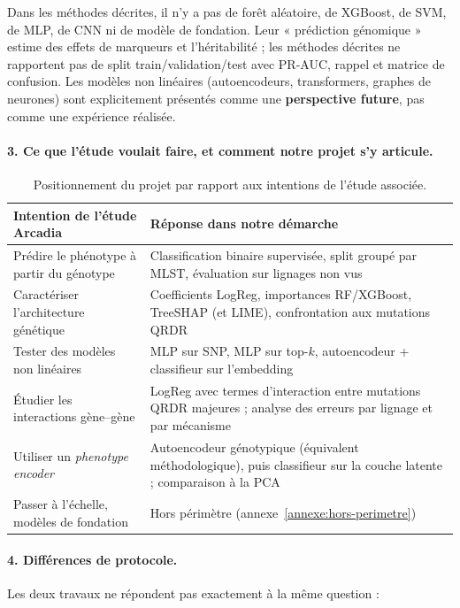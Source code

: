 \documentclass[11pt,a4paper]{article}
\begin{document}
Dans les méthodes décrites, il n'y a pas de forêt aléatoire, de XGBoost, de SVM, de MLP, de CNN ni de modèle de fondation. Leur « prédiction génomique » estime des effets de marqueurs et l'héritabilité ; les méthodes décrites ne rapportent pas de split train/validation/test avec PR-AUC, rappel et matrice de confusion. Les modèles non linéaires (autoencodeurs, transformers, graphes de neurones) sont explicitement présentés comme une \textbf{perspective future}, pas comme une expérience réalisée.

\paragraph{3. Ce que l'étude voulait faire, et comment notre projet s'y articule.}

\begin{table}[H]
\centering
\caption{Positionnement du projet par rapport aux intentions de l'étude associée.}
\label{tab:positionnement}
\small
\begin{tabularx}{\textwidth}{XX}
\toprule
\textbf{Intention de l'étude Arcadia} & \textbf{Réponse dans notre démarche} \\
\midrule
Prédire le phénotype à partir du génotype & Classification binaire supervisée, split groupé par MLST, évaluation sur lignages non vus \\
Caractériser l'architecture génétique & Coefficients LogReg, importances RF/XGBoost, TreeSHAP (et LIME), confrontation aux mutations QRDR \\
Tester des modèles non linéaires & MLP sur SNP, MLP sur top-$k$, autoencodeur + classifieur sur l'embedding \\
Étudier les interactions gène--gène & LogReg avec termes d'interaction entre mutations QRDR majeures ; analyse des erreurs par lignage et par mécanisme \\
Utiliser un \emph{phenotype encoder} & Autoencodeur génotypique (équivalent méthodologique), puis classifieur sur la couche latente ; comparaison à la PCA \\
Passer à l'échelle, modèles de fondation & Hors périmètre (annexe~\ref{annexe:hors-perimetre}) \\
\bottomrule
\end{tabularx}
\end{table}

\paragraph{4. Différences de protocole.}
Les deux travaux ne répondent pas exactement à la même question :
\end{document}
